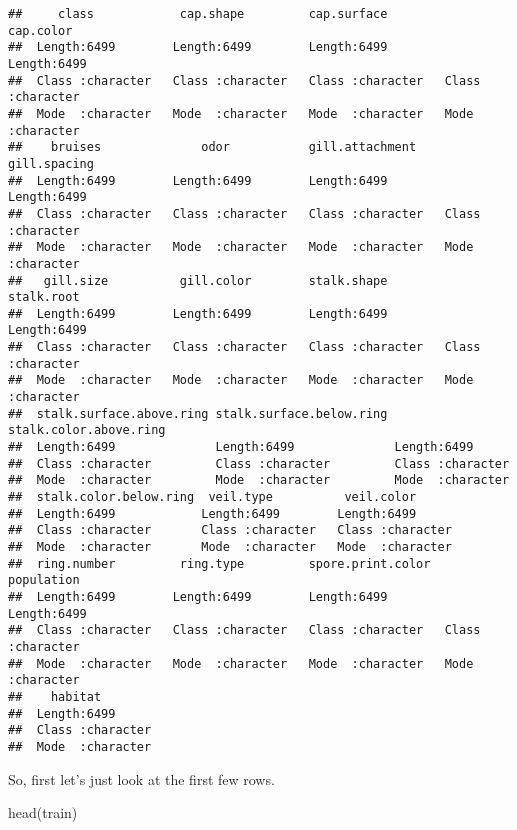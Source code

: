 \documentclass[
]{article}
\newenvironment{Shaded}{\begin{snugshade}}{\end{snugshade}}
\newcommand{\FunctionTok}[1]{\textcolor[rgb]{0.00,0.00,0.00}{#1}}
\newcommand{\NormalTok}[1]{#1}
\begin{document}
\begin{verbatim}
##     class            cap.shape         cap.surface         cap.color        
##  Length:6499        Length:6499        Length:6499        Length:6499       
##  Class :character   Class :character   Class :character   Class :character  
##  Mode  :character   Mode  :character   Mode  :character   Mode  :character  
##    bruises              odor           gill.attachment    gill.spacing      
##  Length:6499        Length:6499        Length:6499        Length:6499       
##  Class :character   Class :character   Class :character   Class :character  
##  Mode  :character   Mode  :character   Mode  :character   Mode  :character  
##   gill.size          gill.color        stalk.shape         stalk.root       
##  Length:6499        Length:6499        Length:6499        Length:6499       
##  Class :character   Class :character   Class :character   Class :character  
##  Mode  :character   Mode  :character   Mode  :character   Mode  :character  
##  stalk.surface.above.ring stalk.surface.below.ring stalk.color.above.ring
##  Length:6499              Length:6499              Length:6499           
##  Class :character         Class :character         Class :character      
##  Mode  :character         Mode  :character         Mode  :character      
##  stalk.color.below.ring  veil.type          veil.color       
##  Length:6499            Length:6499        Length:6499       
##  Class :character       Class :character   Class :character  
##  Mode  :character       Mode  :character   Mode  :character  
##  ring.number         ring.type         spore.print.color   population       
##  Length:6499        Length:6499        Length:6499        Length:6499       
##  Class :character   Class :character   Class :character   Class :character  
##  Mode  :character   Mode  :character   Mode  :character   Mode  :character  
##    habitat         
##  Length:6499       
##  Class :character  
##  Mode  :character
\end{verbatim}

So, first let's just look at the first few rows.

\begin{Shaded}
\begin{Highlighting}[]
\FunctionTok{head}\NormalTok{(train)}
\end{Highlighting}
\end{Shaded}
\end{document}
